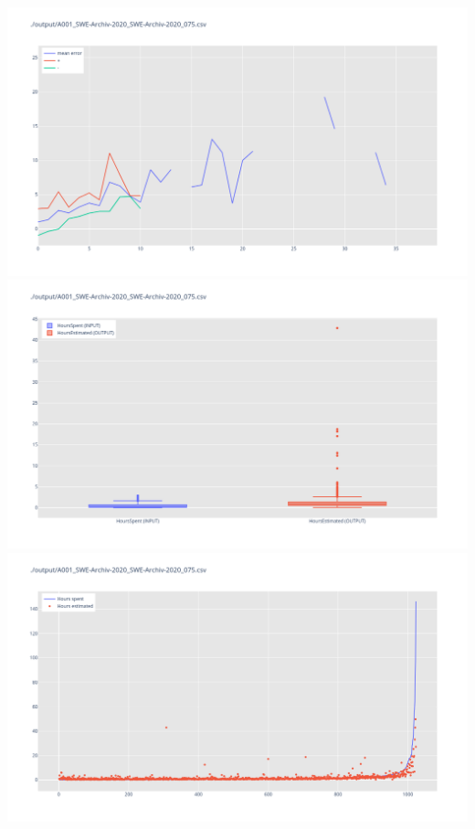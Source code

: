 \includegraphics[width=\textwidth]{Scripts/output/A001_SWE-Archiv-2020_SWE-Archiv-2020_075.csv.error_distribution.png}
\includegraphics[width=\textwidth]{Scripts/output/A001_SWE-Archiv-2020_SWE-Archiv-2020_075.csv.png}
\includegraphics[width=\textwidth]{Scripts/output/A001_SWE-Archiv-2020_SWE-Archiv-2020_075.csv.scatter.png}
